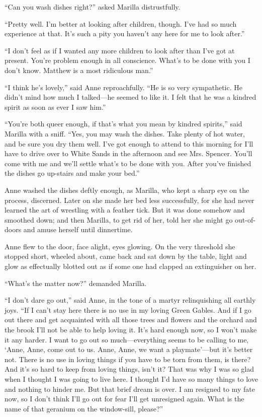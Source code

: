 \documentclass[a4paper]{article}
\begin{document}
``Can you wash dishes right?'' asked Marilla distrustfully.

\tiny{``Pretty well. I'm better at looking after children, though. I've had so much experience at that. It's such a pity you haven't any here for me to look after.''

``I don't feel as if I wanted any more children to look after than I've got at present. You're problem enough in all conscience. What's to be done with you I don't know. Matthew is a most ridiculous man.''

``I think he's lovely,'' said Anne reproachfully. ``He is so very sympathetic. He didn't mind how much I talked---he seemed to like it. I felt that he was a kindred spirit as soon as ever I saw him.''

``You're both queer enough, if that's what you mean by kindred spirits,'' said Marilla with a sniff. ``Yes, you may wash the dishes. Take plenty of hot water, and be sure you dry them well. I've got enough to attend to this morning for I'll have to drive over to White Sands in the afternoon and see Mrs. Spencer. You'll come with me and we'll settle what's to be done with you. After you've finished the dishes go up-stairs and make your bed.''}

\scriptsize{Anne washed the dishes deftly enough, as Marilla, who kept a sharp eye on the process, discerned. Later on she made her bed less successfully, for she had never learned the art of wrestling with a feather tick. But it was done somehow and smoothed down; and then Marilla, to get rid of her, told her she might go out-of-doors and amuse herself until dinnertime.

Anne flew to the door, face alight, eyes glowing. On the very threshold she stopped short, wheeled about, came back and sat down by the table, light and glow as effectually blotted out as if some one had clapped an extinguisher on her.

``What's the matter now?'' demanded Marilla.

``I don't dare go out,'' said Anne, in the tone of a martyr relinquishing all earthly joys. ``If I can't stay here there is no use in my loving Green Gables. And if I go out there and get acquainted with all those trees and flowers and the orchard and the brook I'll not be able to help loving it. It's hard enough now, so I won't make it any harder. I want to go out so much---everything seems to be calling to me, `Anne, Anne, come out to us. Anne, Anne, we want a playmate'---but it's better not. There is no use in loving things if you have to be torn from them, is there? And it's so hard to keep from loving things, isn't it? That was why I was so glad when I thought I was going to live here. I thought I'd have so many things to love and nothing to hinder me. But that brief dream is over. I am resigned to my fate now, so I don't think I'll go out for fear I'll get unresigned again. What is the name of that geranium on the window-sill, please?''}
\end{document}
